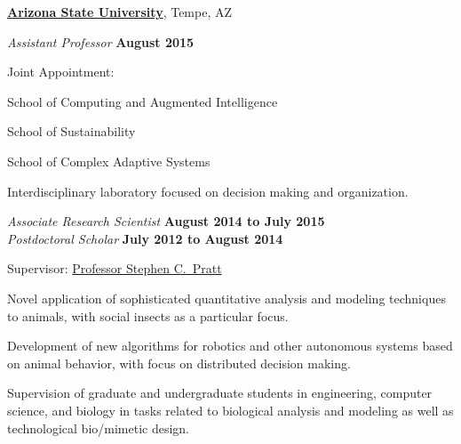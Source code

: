\documentclass[10pt]{article}           %
\begin{document}
\href{http://www.asu.edu/}{\textbf{Arizona State University}},
Tempe, AZ
\begin{outerlist}

    \item[] \textit{Assistant Professor}%
            \hfill \textbf{August 2015}
            \begin{innerlist}
                \item Joint Appointment:
                    \begin{innerlist}
                        \item School of Computing and Augmented Intelligence
                        \item School of Sustainability
                        \item School of Complex Adaptive Systems
                    \end{innerlist}


                \item Interdisciplinary laboratory focused on decision
                    making and organization.
            \end{innerlist}

    \item[] \textit{Associate Research Scientist}%
            \hfill \textbf{August 2014 to July 2015}\\
        \textit{Postdoctoral Scholar}%
            \hfill \textbf{July 2012 to August 2014}
            \begin{innerlist}
                \item Supervisor:
                        \href{http://www.public.asu.edu/~spratt1/}%
                             {Professor Stephen C.~Pratt}

                \item Novel application of sophisticated quantitative
                    analysis and modeling techniques to animals, with
                    social insects as a particular focus.

                \item Development of new algorithms for robotics and
                    other autonomous systems based on animal behavior,
                    with focus on distributed decision making.

                \item Supervision of graduate and undergraduate students
                    in engineering, computer science, and biology in
                    tasks related to biological analysis and modeling as
                    well as technological bio\-/mimetic design.
            \end{innerlist}

\end{outerlist}
\end{document}
